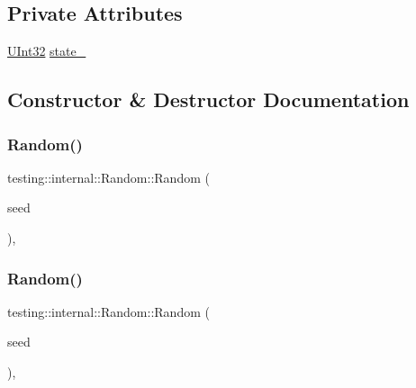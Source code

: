 \subsection*{Private Attributes}
\begin{DoxyCompactItemize}
\item 
\mbox{\hyperlink{namespacetesting_1_1internal_a436defbb8e92c8e94e33ebcc86f278ba}{U\+Int32}} \mbox{\hyperlink{classtesting_1_1internal_1_1_random_ad500e33e3342415afb8a3ab242afa9cc}{state\+\_\+}}
\end{DoxyCompactItemize}


\subsection{Constructor \& Destructor Documentation}
\mbox{\label{classtesting_1_1internal_1_1_random_a6e112be5e7cce00551f6383025f69460}} 
\subsubsection{\texorpdfstring{Random()}{Random()}\hspace{0.1cm}{\footnotesize\ttfamily [1/3]}}
{\footnotesize\ttfamily testing\+::internal\+::\+Random\+::\+Random (\begin{DoxyParamCaption}\item[{\mbox{\hyperlink{namespacetesting_1_1internal_a436defbb8e92c8e94e33ebcc86f278ba}{U\+Int32}}}]{seed }\end{DoxyParamCaption})\hspace{0.3cm}{\ttfamily [inline]}, {\ttfamily [explicit]}}

\mbox{\label{classtesting_1_1internal_1_1_random_a6e112be5e7cce00551f6383025f69460}} 
\subsubsection{\texorpdfstring{Random()}{Random()}\hspace{0.1cm}{\footnotesize\ttfamily [2/3]}}
{\footnotesize\ttfamily testing\+::internal\+::\+Random\+::\+Random (\begin{DoxyParamCaption}\item[{\mbox{\hyperlink{namespacetesting_1_1internal_a436defbb8e92c8e94e33ebcc86f278ba}{U\+Int32}}}]{seed }\end{DoxyParamCaption})\hspace{0.3cm}{\ttfamily [inline]}, {\ttfamily [explicit]}}

